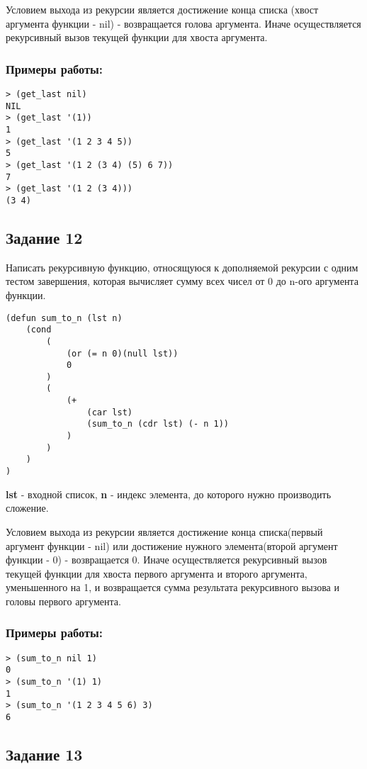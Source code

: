 \documentclass[a4paper,12pt]{article}
\begin{document}
Условием выхода из рекурсии является достижение конца списка (хвост аргумента функции - nil) - возвращается голова аргумента. Иначе осуществляется рекурсивный вызов текущей функции для хвоста аргумента.

\subsubsection*{Примеры работы:}
\begin{lstlisting}
> (get_last nil)
NIL
> (get_last '(1))
1
> (get_last '(1 2 3 4 5))
5
> (get_last '(1 2 (3 4) (5) 6 7))
7
> (get_last '(1 2 (3 4)))
(3 4)
\end{lstlisting}

\subsection*{Задание 12}

Написать рекурсивную функцию, относящуюся к дополняемой рекурсии с одним тестом завершения, которая вычисляет сумму всех чисел от 0 до n-ого аргумента функции. 
\begin{lstlisting}[caption=Функция вычисления суммы элементов от 0 до n-го]
(defun sum_to_n (lst n)
	(cond
		(
			(or (= n 0)(null lst))
			0
		)
		(
			(+ 
				(car lst)
				(sum_to_n (cdr lst) (- n 1))
			)
		)
	)
)	
\end{lstlisting}
\textbf{lst} - входной список, \textbf{n} - индекс элемента, до которого нужно производить сложение.

Условием выхода из рекурсии является достижение конца списка(первый аргумент функции - nil) или достижение нужного элемента(второй аргумент функции - 0) - возвращается 0. Иначе осуществляется рекурсивный вызов текущей функции для хвоста первого аргумента и второго аргумента, уменьшенного на 1, и возвращается сумма результата рекурсивного вызова и головы первого аргумента.
\subsubsection*{Примеры работы:}
\begin{lstlisting}
> (sum_to_n nil 1)
0
> (sum_to_n '(1) 1)
1
> (sum_to_n '(1 2 3 4 5 6) 3)
6
\end{lstlisting}

\subsection*{Задание 13}
\end{document}
